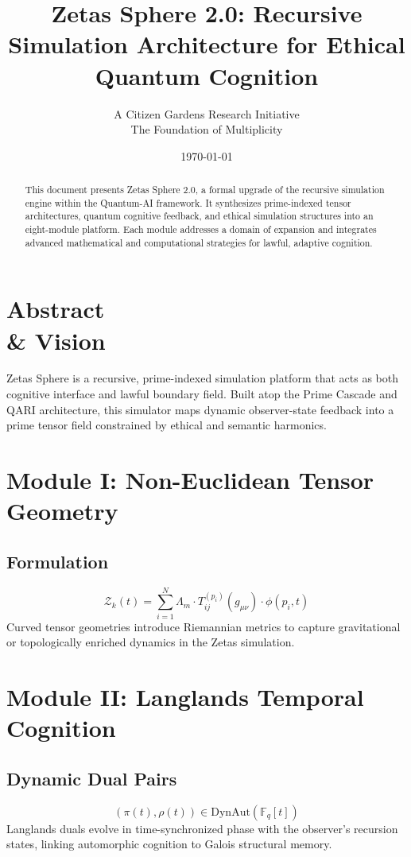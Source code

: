 \documentclass[12pt]{article}
\title{\textbf{Zetas Sphere 2.0: Recursive Simulation Architecture for Ethical Quantum Cognition}}
\author{A Citizen Gardens Research Initiative \\ The Foundation of Multiplicity}
\date{\today}
\begin{document}
\maketitle

\begin{abstract}
This document presents Zetas Sphere 2.0, a formal upgrade of the recursive simulation engine within the Quantum-AI framework. It synthesizes prime-indexed tensor architectures, quantum cognitive feedback, and ethical simulation structures into an eight-module platform. Each module addresses a domain of expansion and integrates advanced mathematical and computational strategies for lawful, adaptive cognition.
\end{abstract}

\tableofcontents
\newpage

\section{Abstract \\ \& Vision}
Zetas Sphere is a recursive, prime-indexed simulation platform that acts as both cognitive interface and lawful boundary field. Built atop the Prime Cascade and QARI architecture, this simulator maps dynamic observer-state feedback into a prime tensor field constrained by ethical and semantic harmonics.

\section{Module I: Non-Euclidean Tensor Geometry}
\subsection*{Formulation}
\begin{equation}
\mathcal{Z}_k(t) = \sum_{i=1}^N \Lambda_m \cdot T_{ij}^{(p_i)}(g_{\mu\nu}) \cdot \phi(p_i, t)
\end{equation}
Curved tensor geometries introduce Riemannian metrics to capture gravitational or topologically enriched dynamics in the Zetas simulation.

\section{Module II: Langlands Temporal Cognition}
\subsection*{Dynamic Dual Pairs}
\begin{equation}
(\pi(t), \rho(t)) \in \text{DynAut}(\mathbb{F}_q[t])
\end{equation}
Langlands duals evolve in time-synchronized phase with the observer's recursion states, linking automorphic cognition to Galois structural memory.
\end{document}
